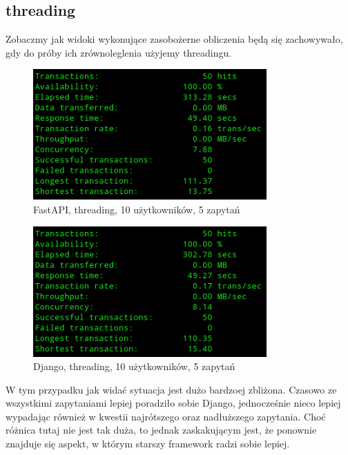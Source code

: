 \subsection{threading}
Zobaczmy jak widoki wykonujące zasobożerne obliczenia będą się zachowywało, gdy do próby ich zrównoleglenia użyjemy threadingu.
\begin{figure}[H]
    \includegraphics[height=50mm]{zdjecia/10_math_thread_fast}
    \centering
    \caption{FastAPI, threading, 10 użytkowników, 5 zapytań}
\end{figure}

\begin{figure}[H]
    \includegraphics[height=50mm]{zdjecia/10_math_thread_django}
    \centering
    \caption{Django, threading, 10 użytkowników, 5 zapytań}
\end{figure}
W tym przypadku jak widać sytuacja jest dużo bardzoej zbliżona. Czasowo ze wszystkimi zapytaniami lepiej poradziło sobie Django, jednocześnie nieco lepiej wypadając również w kwestii najrótszego oraz nadłuższego zapytania. Choć różnica tutaj nie jest tak duża, to jednak zaskakującym jest, że ponownie znajduje się aspekt, w którym starszy framework radzi sobie lepiej.

